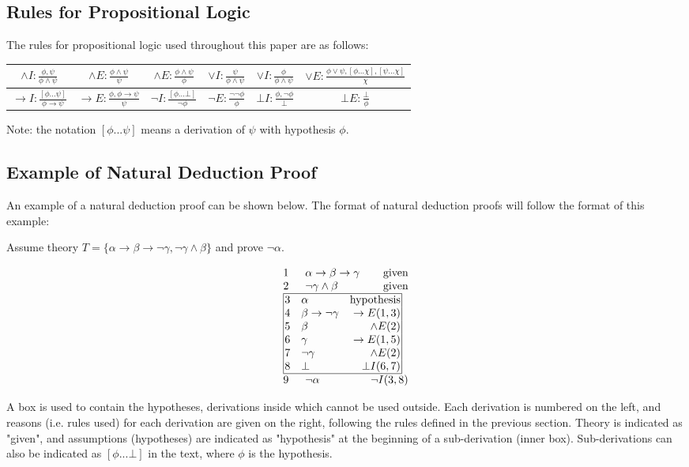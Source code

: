 \documentclass[11pt,twoside,a4paper]{report}
\begin{document}
\subsection{Rules for Propositional Logic}
\label{subsec:logicrules}
The rules for propositional logic used throughout this paper are as follows:

\begin{tabular}{|c|c|c|c|c|c|}
\hline
$\wedge I:\frac{\phi, \psi}{\phi\wedge\psi}$ &
$\wedge E:\frac{\phi\wedge\psi}{\psi}$ &
$\wedge E:\frac{\phi\wedge\psi}{\phi}$ &
$\vee I:\frac{\psi}{\phi\wedge\psi}$ & 
$\vee I:\frac{\phi}{\phi\wedge\psi}$ &
$\vee E:\frac{\phi\vee\psi, [\phi...\chi], [\psi...\chi]}{\chi}$ \\
\hline
$\rightarrow I:\frac{[\phi...\psi]}{\phi\rightarrow\psi}$ & 
$\rightarrow E:\frac{\phi, \phi\rightarrow\psi}{\psi}$ &
$\neg I:\frac{[\phi...\bot]}{\neg\phi}$ &
$\neg E:\frac{\neg\neg\phi}{\phi}$ &
$\bot I:\frac{\phi, \neg\phi}{\bot}$ &
$\bot E:\frac{\bot}{\phi}$ \\
\hline
\end{tabular}

Note: the notation $[\phi...\psi]$ means a derivation of $\psi$ with hypothesis $\phi$.

\subsection{Example of Natural Deduction Proof}
An example of a natural deduction proof can be shown below. The format of natural deduction proofs will follow the format of this example:

Assume theory $T = \{\alpha\rightarrow\beta\rightarrow\neg\gamma, \neg\gamma\wedge\beta\}$ and prove $\neg\alpha$.

\[\vbox{\offinterlineskip\halign{
&\tabskip=1.5em#\strut&$#$\hfil\tabskip=1em&\hfil$#$\tabskip=0em\cr
%
1&\alpha\rightarrow\beta\rightarrow\gamma&\mbox{given}\cr
2&\neg\gamma\wedge\beta&\mbox{given}\cr
%
\multispan3\vbox{\halign{
\vrule#&&\hskip.1em\tabskip=1em#\strut&$#$\hfil\tabskip=1em&\hfil$#$\hskip0.1em\tabskip=0em&\vrule#\cr
\noalign{\hrule}
%
&3&\alpha&\mbox{hypothesis}&\cr
&4&\beta\rightarrow\neg\gamma&\rightarrow E(1,3)&\cr
&5&\beta&\wedge E(2)&\cr
&6&\gamma&\rightarrow E(1,5)&\cr
&7&\neg\gamma&\wedge E(2)&\cr
&8&\bot&\bot I(6,7)&\cr
%
\noalign{\hrule}}}\,\cr
%
9&\neg\alpha&\neg I(3,8)\cr
}}\]

A box is used to contain the hypotheses, derivations inside which cannot be used outside. Each derivation is numbered on the left, and reasons (i.e. rules used) for each derivation are given on the right, following the rules defined in the previous section. Theory is indicated as "given", and assumptions (hypotheses) are indicated as "hypothesis" at the beginning of a sub-derivation (inner box). Sub-derivations can also be indicated as $[\phi ... \bot]$ in the text, where $\phi$ is the hypothesis.
\end{document}

